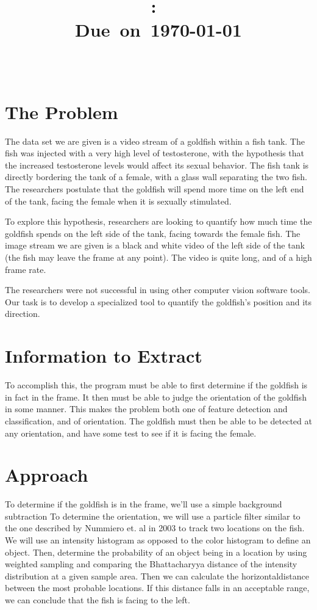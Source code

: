 \documentclass[english]{report}
\title{\vspace{2in}\textmd{\textbf{\hmwkClass:\
\hmwkTitle}}\\\normalsize\vspace{0.1in}\small{Due\ on\
\today}\\\vspace{0.1in}\large{\textit{\classInstructor\ }}\vspace{3in}}
\date{}
\author{\textbf{\authorName}}
\begin{document}
\begin{spacing}{1.1}


\section{The Problem}

The data set we are given is a video stream of a goldfish within a fish
tank. The fish was injected with a very high level of testosterone, with
the hypothesis that the increased testosterone levels would affect its
sexual behavior. The fish tank is directly bordering the tank of a
female, with a glass wall separating the two fish. The researchers
postulate that the goldfish will spend more time on the left end of the
tank, facing the female when it is sexually stimulated.

To explore this hypothesis, researchers are looking to quantify how much
time the goldfish spends on the left side of the tank, facing towards
the female fish. The image stream we are given is a black and white
video of the left side of the tank (the fish may leave the frame at any
point). The video is quite long, and of a high frame rate.

The researchers were not successful in using other computer vision
software tools. Our task is to develop a specialized tool to quantify
the goldfish's position and its direction.

\section{Information to Extract}

To accomplish this, the program must be able to first determine if the
goldfish is in fact in the frame. It then must be able to judge the
orientation of the goldfish in some manner. This makes the problem both
one of feature detection and classification, and of orientation. The
goldfish must then be able to be detected at any orientation, and have
some test to see if it is facing the female.

\section{Approach}

To determine if the goldfish is in the frame, we'll use a simple
background subtraction  To determine the orientation, we will use a
particle filter similar to the one described by Nummiero et. al
in 2003 to track two locations on the fish. We will use an intensity
histogram as opposed to the color histogram to define an object. Then,
determine the probability of an object being in a location by using weighted 
sampling and comparing the Bhattacharyya distance of the intensity distribution
at a given sample area. Then we can calculate the horizontaldistance between
the most probable locations. If this distance falls in an acceptable range,
we can conclude that the fish is facing to the left.


\end{spacing}
\end{document}
